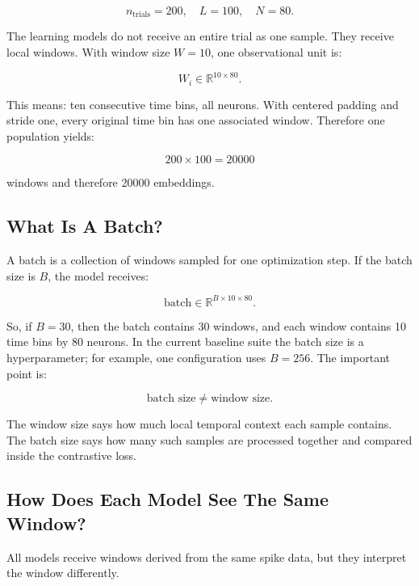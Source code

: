 \documentclass[11pt]{article}
\begin{document}
\begin{equation}
n_{\text{trials}}=200,
\quad
L=100,
\quad
N=80.
\end{equation}

The learning models do not receive an entire trial as one sample. They receive
local windows. With window size $W=10$, one observational unit is:

\begin{equation}
W_i \in \mathbb{R}^{10 \times 80}.
\end{equation}

This means: ten consecutive time bins, all neurons. With centered padding and
stride one, every original time bin has one associated window. Therefore one
population yields:

\begin{equation}
200 \times 100 = 20000
\end{equation}

windows and therefore 20000 embeddings.

\subsection{What Is A Batch?}

A batch is a collection of windows sampled for one optimization step. If the
batch size is $B$, the model receives:

\begin{equation}
\text{batch}
\in
\mathbb{R}^{B \times 10 \times 80}.
\end{equation}

So, if $B=30$, then the batch contains 30 windows, and each window contains 10
time bins by 80 neurons. In the current baseline suite the batch size is a
hyperparameter; for example, one configuration uses $B=256$. The important
point is:

\begin{equation}
\text{batch size} \ne \text{window size}.
\end{equation}

The window size says how much local temporal context each sample contains. The
batch size says how many such samples are processed together and compared
inside the contrastive loss.

\subsection{How Does Each Model See The Same Window?}

All models receive windows derived from the same spike data, but they interpret
the window differently.
\end{document}

